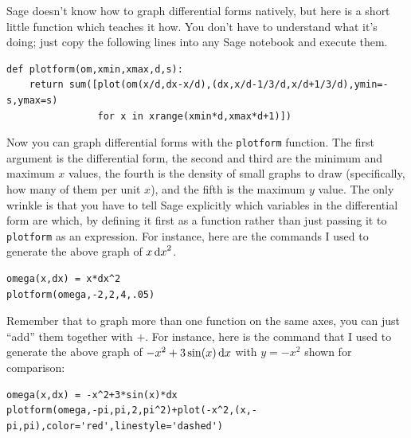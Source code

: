 \documentclass[12pt]{amsart}
\begin{document}
\begin{sage}
  Sage doesn't know how to graph differential forms natively, but here is a short little function which teaches it how.
  You don't have to understand what it's doing; just copy the following lines into any Sage notebook and execute them.
\begin{verbatim}
def plotform(om,xmin,xmax,d,s):
    return sum([plot(om(x/d,dx-x/d),(dx,x/d-1/3/d,x/d+1/3/d),ymin=-s,ymax=s)
                for x in xrange(xmin*d,xmax*d+1)])
\end{verbatim}

  Now you can graph differential forms with the \texttt{plotform} function.
  The first argument is the differential form, the second and third are the minimum and maximum $x$ values, the fourth is the density of small graphs to draw (specifically, how many of them per unit $x$), and the fifth is the maximum $y$ value.
  The only wrinkle is that you have to tell Sage explicitly which variables in the differential form are which, by defining it first as a function rather than just passing it to \texttt{plotform} as an expression.
  For instance, here are the commands I used to generate the above graph of $x\,{\mathrm{d} x}^2$.
\begin{verbatim}
omega(x,dx) = x*dx^2
plotform(omega,-2,2,4,.05)
\end{verbatim}

  Remember that to graph more than one function on the same axes, you can just ``add'' them together with $+$.
  For instance, here is the command that I used to generate the above graph of $-x^2 + 3\sin(x)\,{\mathrm{d} x}$ with $y=-x^2$ shown for comparison:
\begin{verbatim}
omega(x,dx) = -x^2+3*sin(x)*dx
plotform(omega,-pi,pi,2,pi^2)+plot(-x^2,(x,-pi,pi),color='red',linestyle='dashed')
\end{verbatim}
\end{sage}
\end{document}
